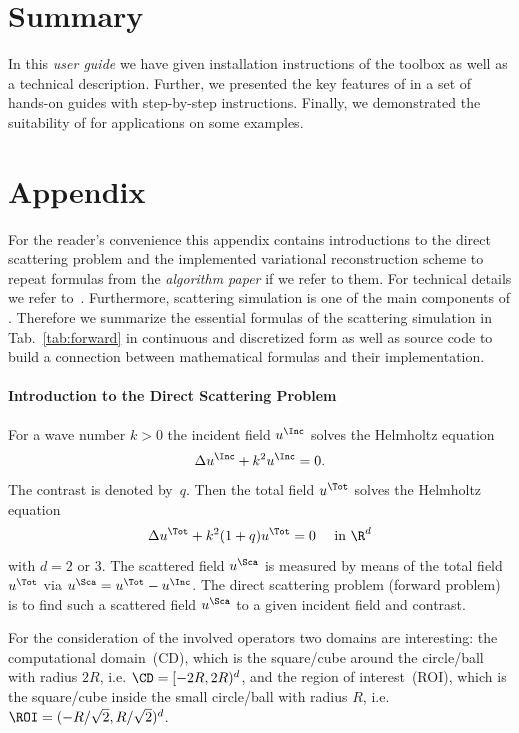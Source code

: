 \documentclass[a4paper]{article}
\begin{document}

\section*{Summary}
In this \emph{user guide} we have given installation instructions of the toolbox \IPscatt as well as a technical description. Further, we presented the key features of \IPscatt in a set of hands-on guides with step-by-step instructions. Finally, we demonstrated the suitability of \IPscatt for applications on some examples.


\section*{Appendix}\label{sec:app}

For the reader's convenience this appendix contains introductions to the direct scattering problem and the implemented variational reconstruction scheme to repeat formulas from the \emph{algorithm paper} if we refer to them. For technical details we refer to~\cite{Buergel2017}. Furthermore, scattering simulation is one of the main components of \IPscatt. Therefore we summarize the essential formulas of the scattering simulation in Tab.~\ref{tab:forward} in continuous and discretized form as well as source code to build a connection between mathematical formulas and their implementation.

\paragraph{Introduction to the Direct Scattering Problem} For a wave number $k > 0$ the incident field $u^\Inc$ solves the Helm\-holtz equation
\begin{equation}\label{eq:HEQinc}
\Delta u^\Inc + k^2 u^\Inc = 0.
\end{equation}
The contrast is denoted by~$q$. Then the total field $u^\Tot$ solves the Helm\-holtz equation
\begin{equation}\label{eq:HEQ}
 \Delta u^\Tot + k^2 (1+q) u^\Tot = 0 \quad \text{ in } \R^d
\end{equation}
with $d = 2$ or $3$. 
The scattered field $u^\Sca$ is measured by means of the total field $u^\Tot$ via $u^\Sca = u^\Tot - u^\Inc$. The direct scattering problem (forward problem) is to find such a scattered field $u^\Sca$ to a given incident field and contrast.

For the consideration of the involved operators two domains are interesting: the computational domain~(CD), which is the square/cube around the circle/ball with radius $2R$, i.e. $\CD = [-2R,2R)^d$, and the region of interest~(ROI), which is the square/cube inside the small circle/ball with radius $R$, i.e. $\ROI = (-R/\sqrt{2},R/\sqrt{2})^d$.
\end{document}
